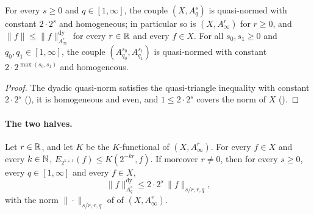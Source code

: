 \begin{lemma}
\label{lem:approximation-space-couples}
\leanok
{}
For every $s \geq 0$ and $q \in [1, \infty]$, the couple $(X, A^s_q)$ is quasi-normed with
constant $2 \cdot 2^s$ and homogeneous; in particular so is $(X, A^r_\infty)$ for $r \geq 0$, and
$\|f\| \leq \|f\|^{\mathrm{dy}}_{A^r_\infty}$ for every $r \in \mathbb{R}$ and every $f \in X$. For all
$s_0, s_1 \geq 0$ and $q_0, q_1 \in [1, \infty]$, the couple $(A^{s_0}_{q_0}, A^{s_1}_{q_1})$
is quasi-normed with constant $2 \cdot 2^{\max(s_0, s_1)}$ and homogeneous.
\end{lemma}

\begin{proof}
\leanok
The dyadic quasi-norm satisfies the quasi-triangle inequality with constant $2 \cdot 2^s$
(), it is homogeneous and even, and $1 \leq 2 \cdot 2^s$ covers the
norm of $X$ ().
\end{proof}

\paragraph{The two halves.}

\begin{lemma}
\label{lem:approximation-space-couple-direct}
\leanok
{}
Let $r \in \mathbb{R}$, and let $K$ be the $K$-functional of $(X, A^r_\infty)$. For every $f \in X$ and
every $k \in \mathbb{N}$, $E_{2^{k+1}}(f) \leq K(2^{-kr}, f)$. If moreover $r \neq 0$, then for every
$s \geq 0$, every $q \in [1, \infty]$ and every $f \in X$,
\[
  \|f\|^{\mathrm{dy}}_{A^s_q} \leq 2 \cdot 2^s \, \|f\|_{s/r, r, q} ,
\]
with the norm $\|\cdot\|_{s/r, r, q}$ of  of $(X, A^r_\infty)$.
\end{lemma}

